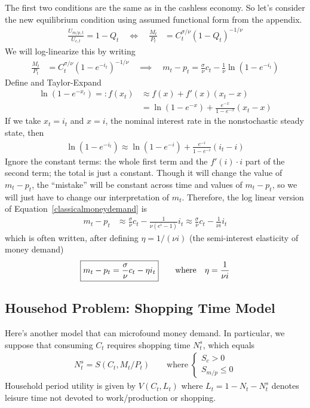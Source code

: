 \documentclass[12pt]{article}
\theoremstyle{plain}
\theoremstyle{definition}
\theoremstyle{remark}
\begin{document}
The first two conditions are the same as in the cashless economy. So
let's consider the new equilibrium condition using assumed functional
form from the appendix.
\begin{align*}
  \frac{U_{m/p,t}}{U_{c,t}}
  =
  1 - Q_t
  \quad\iff\quad
  \frac{M_t}{P_t}
  &=
  C_t^{\sigma/\nu}(1 - Q_t)^{-1/\nu}
\end{align*}
We will log-linearize this by writing
\begin{align}
  \frac{M_t}{P_t}
  &=
  C_t^{\sigma/\nu}(1 - e^{-i_t})^{-1/\nu}
  \quad\implies\quad
  m_t - p_t
  =
  \frac{\sigma}{\nu}c_t
  -\frac{1}{\nu}\ln(1 - e^{-i_t})
  \label{classicalmoneydemand}
\end{align}
Define and Taylor-Expand
\begin{align*}
   \ln(1-e^{-x_t}) =: f(x_t)
  &\approx f(x) + f'(x)(x_t-x) \\
  &= \ln(1-e^{-x}) + \frac{e^{-x}}{1-e^{-x}}(x_t-x)
\end{align*}
If we take $x_t=i_t$ and $x=i$, the nominal interest rate in the
nonstochastic steady state, then
\begin{align*}
  \ln(1-e^{-i_t})\approx
  \ln(1-e^{-i})
  + \frac{e^{-i}}{1-e^{-i}}
  (i_t-i)
\end{align*}
Ignore the constant terms: the whole first term and the $f'(i)\cdot i$
part of the second term; the total is just a constant. Though it
will change the value of $m_t-p_t$, the ``mistake'' will be constant
across time and values of $m_t-p_t$, so we will just have to change
our interpretation of $m_t$. Therefore, the log linear version of
Equation~\ref{classicalmoneydemand} is
\begin{align*}
  m_t - p_t
  &\approx
  \frac{\sigma}{\nu}c_t
  - \frac{1}{\nu(e^{i}-1)}
  i_t
  \approx
  \frac{\sigma}{\nu}c_t
  - \frac{1}{\nu i} i_t
\end{align*}
which is often written, after defining $\eta=1/(\nu i)$ (the
semi-interest elasticity of money demand)
\begin{align*}
\boxed{%
  m_t - p_t
  =
  \frac{\sigma}{\nu}c_t
  - \eta i_t
}
  \qquad \text{where}\quad
  \eta = \frac{1}{\nu i}
\end{align*}


\clearpage
\subsection{Househod Problem: Shopping Time Model}

Here's another model that can microfound money demand.
In particular, we suppose that consuming $C_t$
requires shopping time $N_t^s$, which equals
\begin{align*}
  N_t^s=S(C_t,M_t/P_t)
  \qquad \text{where}\;
  \begin{cases}
    S_c > 0 \\
    S_{m/p} \leq 0
  \end{cases}
\end{align*}
Household period utility is given by $V(C_t,L_t)$ where
$L_t=1-N_t-N_t^s$ denotes leisure time not devoted to work/production or
shopping.
\end{document}
